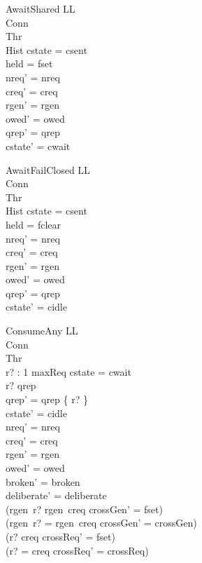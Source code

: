 \documentclass[a4paper,10pt,fleqn]{article}
\begin{document}
\begin{schema}{AwaitShared}
  \Delta LL \\
  \Xi Conn \\
  \Xi Thr \\
  \Xi Hist
\where
  cstate = csent \\
  held = fset \\
  nreq' = nreq \\
  creq' = creq \\
  rgen' = rgen \\
  owed' = owed \\
  qrep' = qrep \\
  cstate' = cwait
\end{schema}

\begin{schema}{AwaitFailClosed}
  \Delta LL \\
  \Xi Conn \\
  \Xi Thr \\
  \Xi Hist
\where
  cstate = csent \\
  held = fclear \\
  nreq' = nreq \\
  creq' = creq \\
  rgen' = rgen \\
  owed' = owed \\
  qrep' = qrep \\
  cstate' = cidle
\end{schema}

\begin{schema}{ConsumeAny}
  \Delta LL \\
  \Xi Conn \\
  \Xi Thr \\
  r? : 1 \upto maxReq
\where
  cstate = cwait \\
  r? \in qrep \\
  qrep' = qrep \setminus \{ r? \} \\
  cstate' = cidle \\
  nreq' = nreq \\
  creq' = creq \\
  rgen' = rgen \\
  owed' = owed \\
  broken' = broken \\
  deliberate' = deliberate \\
  (rgen~r? \neq rgen~creq \implies crossGen' = fset) \\
  (rgen~r? = rgen~creq \implies crossGen' = crossGen) \\
  (r? \neq creq \implies crossReq' = fset) \\
  (r? = creq \implies crossReq' = crossReq)
\end{schema}
\end{document}
